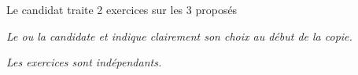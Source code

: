 \newpage
\vAligne{-70pt}

\begin{boite}
  \centering
  Le candidat traite  2 exercices sur les 3 proposés

  \begin{multicols}{3}
    \boiteGanache
    \boiteGABA
    \boiteCardiovasculaireEchographie
  \end{multicols}
\end{boite}

\textit{
  Le ou la candidate  et indique clairement son choix au début de la copie.
}

\begin{center} 
  \textit{Les exercices sont indépendants.}
\end{center}

\vspace*{20pt}


\vspace*{24pt}


\pasCorrection{\newpage} \correction{\vspace*{24pt}}


\newpage
\annexe 

\annexeGABA

\bigskip
\annexeCardiovasculaireEchographie

